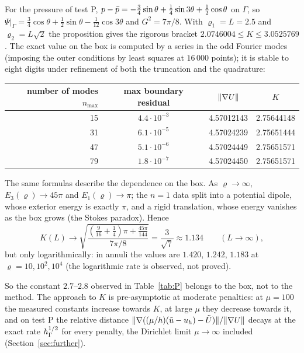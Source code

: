 For the pressure of test P, $p-\bar p=-\frac34\sin\theta+\frac14\sin3\theta+\frac12\cos\theta$ on $\Gamma$, so $\Psi|_\Gamma=\frac34\cos\theta+\frac12\sin\theta-\frac1{12}\cos3\theta$ and $G^2=7\pi/8$. With $\varrho_1=L=2.5$ and $\varrho_2=L\sqrt2$ the proposition gives the rigorous bracket $2.0746004\le K\le3.0525769$. The exact value on the box is computed by a series in the odd Fourier modes (imposing the outer conditions by least squares at $16\,000$ points); it is stable to eight digits under refinement of both the truncation and the quadrature:
\begin{center}\small
\begin{tabular}{rccc}
\toprule
number of modes $n_{\max}$ & max boundary residual & $\lVert \nabla U\rVert$ & $K$\\
\midrule
15 & $4.4\cdot10^{-3}$ & 4.57012143 & 2.75644148\\
31 & $6.1\cdot10^{-5}$ & 4.57024239 & 2.75651444\\
47 & $5.1\cdot10^{-6}$ & 4.57024449 & 2.75651571\\
79 & $1.8\cdot10^{-7}$ & 4.57024450 & 2.75651571\\
\bottomrule
\end{tabular}
\end{center}
The same formulas describe the dependence on the box. As $\varrho\to\infty$, $E_3(\varrho)\to45\pi$ and $E_1(\varrho)\to\pi$; the $n=1$ data split into a potential dipole, whose exterior energy is exactly $\pi$, and a rigid translation, whose energy vanishes as the box grows (the Stokes paradox). Hence
\[
K(L)\longrightarrow\sqrt{\frac{(\frac9{16}+\frac14)\pi+\frac{45\pi}{144}}{7\pi/8}}=\frac3{\sqrt7}\approx1.134\qquad(L\to\infty),
\]
but only logarithmically: in annuli the values are $1.420$, $1.242$, $1.183$ at $\varrho=10,10^2,10^4$ (the logarithmic rate is observed, not proved).

So the constant $2.7$--$2.8$ observed in Table~\ref{tab:P} belongs to the box, not to the method. The approach to $K$ is pre-asymptotic at moderate penalties: at $\mu=100$ the measured constants increase towards $K$, at large $\mu$ they decrease towards it, and on test P the relative distance $\lVert \nabla((\mu/h)(\tilde u-u_h)-\tilde U)\rVert/\lVert \nabla U\rVert$ decays at the exact rate $h_\Gamma^{1/2}$ for every penalty, the Dirichlet limit $\mu\to\infty$ included (Section~\ref{sec:further}).
